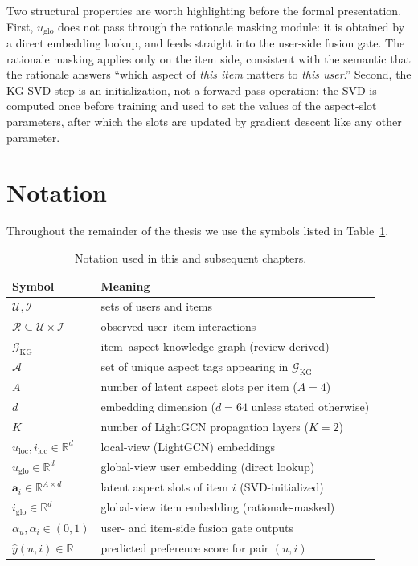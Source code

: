 Two structural properties are worth highlighting before the formal presentation. First, $u_{\mathrm{glo}}$ does not pass through the rationale masking module: it is obtained by a direct embedding lookup, and feeds straight into the user-side fusion gate. The rationale masking applies only on the item side, consistent with the semantic that the rationale answers ``which aspect of \emph{this item} matters to \emph{this user}.'' Second, the KG-SVD step is an initialization, not a forward-pass operation: the SVD is computed once before training and used to set the values of the aspect-slot parameters, after which the slots are updated by gradient descent like any other parameter.

\section{Notation}
\label{sec:approach-notation}

Throughout the remainder of the thesis we use the symbols listed in Table~\ref{tab:notation}.

\begin{table}[ht]
\centering
\caption{Notation used in this and subsequent chapters.}
\label{tab:notation}
\begin{tabular}{ll}
\toprule
Symbol & Meaning \\
\midrule
$\mathcal{U}, \mathcal{I}$           & sets of users and items \\
$\mathcal{R} \subseteq \mathcal{U} \times \mathcal{I}$ & observed user--item interactions \\
$\mathcal{G}_{\mathrm{KG}}$          & item--aspect knowledge graph (review-derived) \\
$\mathcal{A}$                        & set of unique aspect tags appearing in $\mathcal{G}_{\mathrm{KG}}$ \\
$A$                                  & number of latent aspect slots per item ($A=4$) \\
$d$                                  & embedding dimension ($d=64$ unless stated otherwise) \\
$K$                                  & number of LightGCN propagation layers ($K=2$) \\
$u_{\mathrm{loc}}, i_{\mathrm{loc}} \in \mathbb{R}^d$ & local-view (LightGCN) embeddings \\
$u_{\mathrm{glo}} \in \mathbb{R}^d$   & global-view user embedding (direct lookup) \\
$\mathbf{a}_i \in \mathbb{R}^{A \times d}$ & latent aspect slots of item $i$ (SVD-initialized) \\
$i_{\mathrm{glo}} \in \mathbb{R}^d$    & global-view item embedding (rationale-masked) \\
$\alpha_u, \alpha_i \in (0,1)$        & user- and item-side fusion gate outputs \\
$\hat{y}(u, i) \in \mathbb{R}$         & predicted preference score for pair $(u, i)$ \\
\bottomrule
\end{tabular}
\end{table}

